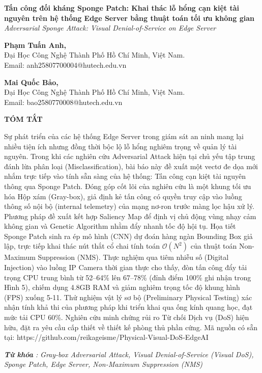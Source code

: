 \textbf{Tấn công đối kháng Sponge Patch: Khai thác lỗ hổng cạn kiệt tài
nguyên trên hệ thống Edge Server bằng thuật toán tối ưu không gian}\\
\emph{Adversarial Sponge Attack: Visual Denial-of-Service on Edge
Server}

\textbf{Phạm Tuấn Anh,}\\
Đại Học Công Nghệ Thành Phố Hồ Chí Minh, Việt Nam.\\
Email: anh25807700004@hutech.edu.vn

\textbf{Mai Quốc Bảo,}\\
Đại Học Công Nghệ Thành Phố Hồ Chí Minh, Việt Nam.\\
Email: bao2580770008@hutech.edu.vn

\textbf{TÓM TẮT}

Sự phát triển của các hệ thống Edge Server trong giám sát an ninh mang
lại nhiều tiện ích nhưng đồng thời bộc lộ lỗ hổng nghiêm trọng về quản
lý tài nguyên. Trong khi các nghiên cứu Adversarial Attack hiện tại chủ
yếu tập trung đánh lừa phân loại (Misclassification), bài báo này đề
xuất một vectơ đe dọa mới nhắm trực tiếp vào tính sẵn sàng của hệ thống:
Tấn công cạn kiệt tài nguyên thông qua Sponge Patch. Đóng góp cốt lõi
của nghiên cứu là một khung tối ưu hóa Hộp xám (Gray-box), giả định kẻ
tấn công có quyền truy cập vào luồng thông số nội bộ (internal
telemetry) của mạng nơ-ron trước màng lọc hậu xử lý. Phương pháp đề xuất
kết hợp Saliency Map để định vị chủ động vùng nhạy cảm không gian và
Genetic Algorithm nhằm đẩy nhanh tốc độ hội tụ. Họa tiết Sponge Patch
sinh ra ép mô hình (CNN) dự đoán hàng ngàn Bounding Box giả lập, trực
tiếp khai thác nút thắt cổ chai tính toán
\(\mathcal{O}\left( N^{2} \right)\) của thuật toán Non-Maximum
Suppression (NMS). Thực nghiệm qua tiêm nhiễu số (Digital Injection) vào
luồng IP Camera thời gian thực cho thấy, đòn tấn công đẩy tải trọng CPU
trung bình từ 52--64\% lên 67--78\% (đỉnh điểm 100\% ghi nhận trong Hình
5), chiếm dụng 4.8GB RAM và giảm nghiêm trọng tốc độ khung hình (FPS)
xuống 5-11. Thử nghiệm vật lý sơ bộ (Preliminary Physical Testing) xác
nhận tính khả thi của phương pháp khi triển khai qua ống kính quang học,
đạt mức tải CPU 60\%. Nghiên cứu minh chứng rủi ro Từ chối Dịch vụ (DoS)
hiện hữu, đặt ra yêu cầu cấp thiết về thiết kế phòng thủ phần cứng. Mã
nguồn có sẵn tại:
https://github.com/reikageisme/Physical-Visual-DoS-EdgeAI

\emph{\textbf{Từ khóa} :} \emph{Gray-box Adversarial Attack, Visual
Denial-of-Service (Visual DoS), Sponge Patch, Edge Server, Non-Maximum
Suppression (NMS)}

